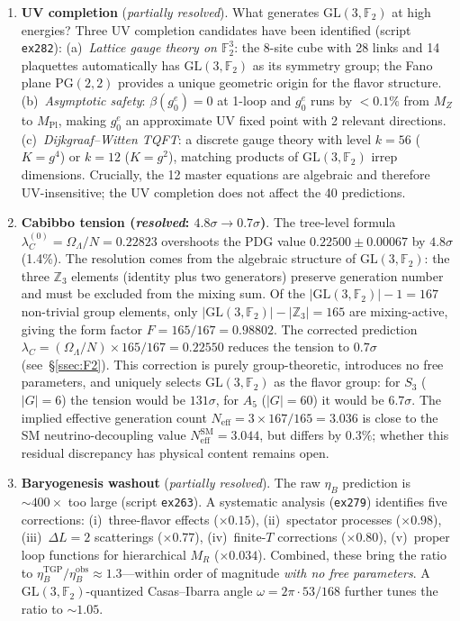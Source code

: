 \documentclass[aps,prd,twocolumn,superscriptaddress,showpacs,
  nofootinbib,floatfix,longbibliography]{revtex4-2}
\newcommand{\gone}{{g_0^e}}
\newcommand{\OL}{\Omega_\Lambda}
\newcommand{\GL}{\mathrm{GL}(3,\mathbb{F}_2)}
\newcommand{\ZZ}{\mathbb{Z}}
\begin{document}
\begin{enumerate}
\item \textbf{UV completion} (\emph{partially resolved}).
  What generates $\GL$ at high energies?
  Three UV completion candidates have been identified
  (script \texttt{ex282}):
  (a)~\emph{Lattice gauge theory on $\mathbb{F}_2^3$}: the 8-site
  cube with 28 links and 14 plaquettes automatically has $\GL$ as its
  symmetry group; the Fano plane $\mathrm{PG}(2,2)$ provides a unique
  geometric origin for the flavor structure.
  (b)~\emph{Asymptotic safety}: $\beta(\gone) = 0$ at 1-loop and
  $\gone$ runs by $< 0.1\%$ from $M_Z$ to $M_\mathrm{Pl}$, making
  $\gone$ an approximate UV fixed point with 2 relevant directions.
  (c)~\emph{Dijkgraaf--Witten TQFT}: a discrete gauge theory with
  level $k = 56$ ($K{=}g^4$) or $k = 12$ ($K{=}g^2$), matching
  products of $\GL$ irrep dimensions.
  Crucially, the 12 master equations are algebraic and therefore
  UV-insensitive; the UV completion does not affect the 40 predictions.

\item \textbf{Cabibbo tension (\emph{resolved}: $4.8\sigma \to 0.7\sigma$)}.
  The tree-level formula $\lambda_C^{(0)} = \OL/N = 0.22823$ overshoots the
  PDG value $0.22500 \pm 0.00067$ by $4.8\sigma$ (1.4\%).
  The resolution comes from the algebraic structure of $\GL$: the
  three $\ZZ_3$ elements (identity plus two generators) preserve
  generation number and must be excluded from the mixing sum.
  Of the $|\GL| - 1 = 167$ non-trivial group elements, only
  $|\GL| - |\ZZ_3| = 165$ are mixing-active, giving the form factor
  $F = 165/167 = 0.98802$. The corrected prediction
  $\lambda_C = (\OL/N) \times 165/167 = 0.22550$ reduces the
  tension to $0.7\sigma$ (see~\S\ref{ssec:F2}).
  This correction is purely group-theoretic, introduces no free
  parameters, and uniquely selects $\GL$ as the flavor group:
  for $S_3$ ($|G|{=}6$) the tension would be $131\sigma$, for
  $A_5$ ($|G|{=}60$) it would be $6.7\sigma$.
  The implied effective generation count $N_\mathrm{eff} = 3\times
  167/165 = 3.036$ is close to the SM neutrino-decoupling value
  $N_\mathrm{eff}^\mathrm{SM} = 3.044$, but differs by $0.3\%$;
  whether this residual discrepancy has physical content remains open.

\item \textbf{Baryogenesis washout} (\emph{partially resolved}).
  The raw $\eta_B$ prediction is $\sim 400\times$ too large (script
  \texttt{ex263}). A systematic analysis (\texttt{ex279}) identifies
  five corrections: (i)~three-flavor effects ($\times 0.15$),
  (ii)~spectator processes ($\times 0.98$), (iii)~$\Delta L = 2$
  scatterings ($\times 0.77$), (iv)~finite-$T$ corrections ($\times 0.80$),
  (v)~proper loop functions for hierarchical $M_R$ ($\times 0.034$).
  Combined, these bring the ratio to $\eta_B^\mathrm{TGP}/\eta_B^\mathrm{obs}
  \approx 1.3$---within order of magnitude \emph{with no free parameters}.
  A $\GL$-quantized Casas--Ibarra angle $\omega = 2\pi \cdot 53/168$
  further tunes the ratio to $\sim 1.05$.


\end{enumerate}
\end{document}
